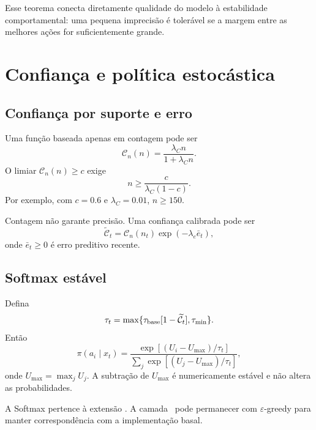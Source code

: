 Esse teorema conecta diretamente qualidade do modelo à estabilidade comportamental: uma pequena imprecisão é tolerável se a margem entre as melhores ações for suficientemente grande.

\section{Confiança e política estocástica}

\subsection{Confiança por suporte e erro}

Uma função baseada apenas em contagem pode ser
\begin{equation}
\mathcal C_n(n)=\frac{\lambda_Cn}{1+\lambda_Cn}.
\end{equation}
O limiar \(\mathcal C_n(n)\ge c\) exige
\begin{equation}
n\ge\frac{c}{\lambda_C(1-c)}.
\end{equation}
Por exemplo, com \(c=0.6\) e \(\lambda_C=0.01\), \(n\ge150\).

Contagem não garante precisão. Uma confiança calibrada pode ser
\begin{equation}
\widetilde{\mathcal C}_t
=\mathcal C_n(n_t)\exp(-\lambda_e\bar e_t),
\label{eq:calibrated_confidence}
\end{equation}
onde \(\bar e_t\ge0\) é erro preditivo recente.

\subsection{Softmax estável}

Defina
\begin{equation}
\tau_t=\max\{\tau_{\rm base}[1-\widetilde{\mathcal C}_t],\tau_{\min}\}.
\end{equation}
Então
\begin{equation}
\pi(a_i\mid x_t)=
\frac{\exp[(U_i-U_{\max})/\tau_t]}
{\sum_j\exp[(U_j-U_{\max})/\tau_t]},
\end{equation}
onde \(U_{\max}=\max_jU_j\). A subtração de \(U_{\max}\) é numericamente estável e não altera as probabilidades.

A Softmax pertence à extensão \EVPM. A camada \EVPB\ pode permanecer com \(\varepsilon\)-greedy para manter correspondência com a implementação basal.

